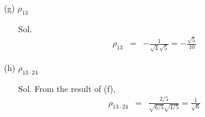 \documentclass[12pt]{article} %
\begin{document}
\begin{enumerate}
\begin{enumerate}
		\item[(g)] $\rho_{13}$
			\begin{enumerate}
				\item[Sol.]
				\begin{eqnarray*}
					\rho_{13}&=&-\frac{1}{\sqrt{4}\sqrt{5}}=-\frac{\sqrt{5}}{10}
				\end{eqnarray*}
			\end{enumerate}
			
		\item[(h)] $\rho_{13 \cdot 24}$
			\begin{enumerate}
				\item[Sol.] From the result of (f), 
					\begin{eqnarray*}
					\rho_{13 \cdot 24}&=&\frac{2/5}{\sqrt{6/5}\sqrt{4/5}}=\frac{1}{\sqrt{6}}
					\end{eqnarray*}
			\end{enumerate}
		

\end{enumerate}
\end{enumerate}
\end{document}
